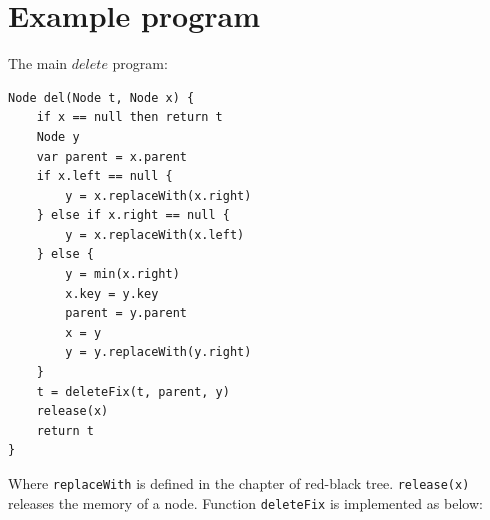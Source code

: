 \documentclass[b5paper]{article}
\begin{document}
\begin{Exercise}
\end{Exercise}

\section{Example program}

The main $delete$ program:

\begin{lstlisting}[language = Bourbaki]
Node del(Node t, Node x) {
    if x == null then return t
    Node y
    var parent = x.parent
    if x.left == null {
        y = x.replaceWith(x.right)
    } else if x.right == null {
        y = x.replaceWith(x.left)
    } else {
        y = min(x.right)
        x.key = y.key
        parent = y.parent
        x = y
        y = y.replaceWith(y.right)
    }
    t = deleteFix(t, parent, y)
    release(x)
    return t
}
\end{lstlisting}

Where \texttt{replaceWith} is defined in the chapter of red-black tree. \texttt{release(x)} releases the memory of a node. Function \texttt{deleteFix} is implemented as below:
\end{document}
